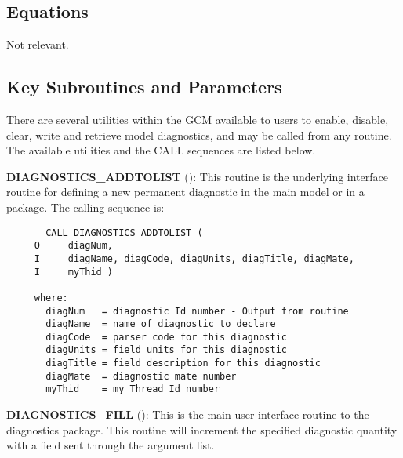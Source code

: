 \subsection{Equations}
Not relevant.

\subsection{Key Subroutines and Parameters}
\label{sec:diagnostics:diagover}

\noindent
There are several utilities within the GCM available to users to
enable, disable, clear, write and retrieve model diagnostics, and may
be called from any routine.  The available utilities and the CALL
sequences are listed below.

\noindent
{\bf DIAGNOSTICS\_ADDTOLIST}
():
This routine is the underlying interface routine for defining a new permanent
diagnostic in the main model or in a package. The calling sequence is:

\begin{verbatim}
       CALL DIAGNOSTICS_ADDTOLIST (
     O     diagNum,
     I     diagName, diagCode, diagUnits, diagTitle, diagMate,
     I     myThid )

     where:
       diagNum   = diagnostic Id number - Output from routine
       diagName  = name of diagnostic to declare
       diagCode  = parser code for this diagnostic
       diagUnits = field units for this diagnostic
       diagTitle = field description for this diagnostic
       diagMate  = diagnostic mate number
       myThid    = my Thread Id number

\end{verbatim}


\noindent
{\bf DIAGNOSTICS\_FILL}
():
This is the main user interface routine to the diagnostics package.
This routine will increment the specified
diagnostic quantity with a field sent through the argument list.

